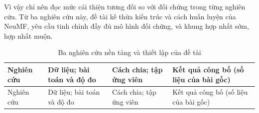Vì vậy chỉ nên đọc mức cải thiện tương đối so với đối chứng trong từng nghiên cứu. Từ ba nghiên cứu này, đề tài kế thừa kiến trúc và cách huấn luyện của NeuMF, yêu cầu tinh chỉnh đầy đủ mô hình đối chứng, và khung hợp nhất sớm, hợp nhất muộn.

\begingroup\small
\begin{xltabular}{\textwidth}{|>{\raggedright\arraybackslash}p{2.2cm}|>{\raggedright\arraybackslash}p{4.1cm}|>{\raggedright\arraybackslash}p{3.3cm}|>{\raggedright\arraybackslash}X|}
    \caption{Ba nghiên cứu nền tảng và thiết lập của đề tài}
    \label{tab:foundation_studies} \\
    \hline
    Nghiên cứu & Dữ liệu; bài toán và độ đo & Cách chia; tập ứng viên & Kết quả công bố (số liệu của bài gốc) \\
    \hline
    \endfirsthead
    \hline
    Nghiên cứu & Dữ liệu; bài toán và độ đo & Cách chia; tập ứng viên & Kết quả công bố (số liệu của bài gốc) \\
    \hline
    \endhead


\end{xltabular}
